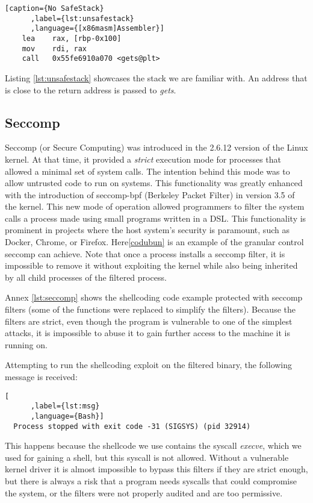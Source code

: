\documentclass{article}
\begin{document}
\begin{lstlisting}[caption={No SafeStack}
      ,label={lst:unsafestack}
      ,language={[x86masm]Assembler}]
    lea    rax, [rbp-0x100]
    mov    rdi, rax
    call   0x55fe6910a070 <gets@plt>
\end{lstlisting}

Listing \ref{lst:unsafestack} showcases the stack we are familiar with. An address that is close to the return address is passed to \emph{gets}.

\subsection{Seccomp}
Seccomp (or Secure Computing) was introduced in the 2.6.12 version of the Linux kernel. At that time, it provided a \emph{strict} execution mode for processes that allowed a minimal set of system calls. The intention behind this mode was to allow untrusted code to run on systems. This functionality was greatly enhanced with the introduction of seccomp-bpf (Berkeley Packet Filter) in version 3.5 of the kernel. This new mode of operation allowed programmers to filter the system calls a process made using small programs written in a DSL. This functionality is prominent in projects where the host system's security is paramount, such as Docker, Chrome, or Firefox. Here\ref{codubun} is an example of the granular control seccomp can achieve. Note that once a process installs a seccomp filter, it is impossible to remove it without exploiting the kernel while also being inherited by all child processes of the filtered process.

Annex \ref{lst:seccomp} shows the shellcoding code example protected with seccomp filters (some of the functions were replaced to simplify the filters). Because the filters are strict, even though the program is vulnerable to one of the simplest attacks, it is impossible to abuse it to gain further access to the machine it is running on.

Attempting to run the shellcoding exploit on the filtered binary, the following message is received:
\begin{lstlisting}[
      ,label={lst:msg}
      ,language={Bash}]
  Process stopped with exit code -31 (SIGSYS) (pid 32914)
\end{lstlisting}

This happens because the shellcode we use contains the syscall \emph{execve}, which we used for gaining a shell, but this syscall is not allowed. Without a vulnerable kernel driver it is almost impossible to bypass this filters if they are strict enough, but there is always a risk that a program needs syscalls that could compromise the system, or the filters were not properly audited and are too permissive.
\end{document}
